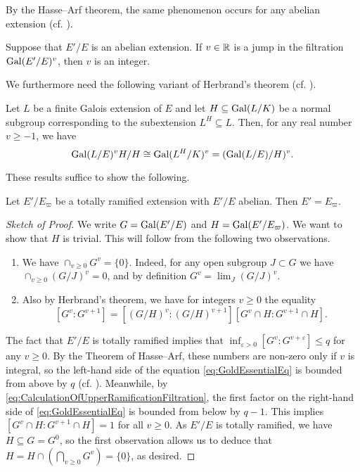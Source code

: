\documentclass[../main.tex]{subfiles}
\begin{document}
By the Hasse--Arf theorem, the same phenomenon occurs for any abelian extension 
(cf. \cite{arf1940untersuchungen}).
\begin{thm}\label{thm:Hasse--Arf}
  Suppose that $E'/E$ is an abelian extension. If $v \in \mathbb{R}$ is a jump in the 
  filtration $\operatorname{Gal}(E'/E)^v$, then $v$ is an integer.
\end{thm}

We furthermore need the following variant of Herbrand's theorem (cf. \cite[Chapter IV,
Proposition 14]{serre2013local}).
\begin{thm}\label{prop:HerbrandsThm}
  Let $L$ be a finite Galois extension of $E$ and let $H \subseteq \operatorname{Gal}(L/K)$ be a
  normal subgroup
  corresponding to the subextension $L^H \subseteq L$. Then, for any real number $v \geq -1$, 
  we have
  \begin{equation*}
    \operatorname{Gal}(L/E)^v H / H \cong \operatorname{Gal}(L^H/K)^v = (\operatorname{Gal}(L/E)/H)^v.
  \end{equation*}
\end{thm}

These results suffice to show the following.

\begin{lem}\label{lem:LocalKronWebAlmostDone}
  Let $E'/E_\varpi$ be a totally ramified extension with $E'/E$ abelian.
  Then $E' = E_\varpi$. 
\begin{proof}[Sketch of Proof]
  We write $G = \operatorname{Gal}(E'/E)$ and $H = \operatorname{Gal}(E'/E_\varpi)$. We want to show that 
  $H$ is trivial. This will follow from the following two observations.
  \begin{enumerate}
    \item We have $\cap_{v \geq 0} G^v = \{0\}$. Indeed, for any open subgroup
      $J \subset G$ we have $\cap_{v \geq 0} (G/J)^v = 0$, and by definition
      $G^v = \lim_J (G/J)^v$. 
    \item Also by Herbrand's theorem, we have for integers $v \geq 0$ the equality
      \begin{equation}\label{eq:GoldEssentialEq}
        [G^v : G^{v+1}] = [(G/H)^v : (G/H)^{v+1}] [G^v \cap H : G^{v+1} \cap H].
      \end{equation}
  \end{enumerate}
  The fact that $E'/E$ is totally ramified implies that $\inf_{\varepsilon > 0}
  [G^v: G^{v+\varepsilon}] \leq q$ for any $v \geq 0$. By the Theorem of 
  Hasse--Arf, these numbers are non-zero only if $v$ is integral, so
  the left-hand side of the equation \eqref{eq:GoldEssentialEq} is bounded from
  above by $q$ (cf. \cite[Lemma 3]{gold1981local}).
  Meanwhile, by \eqref{eq:CalculationOfUpperRamificationFiltration}, the first factor
  on the right-hand side of \eqref{eq:GoldEssentialEq} is bounded from below by
  $q-1$. This implies $[G^v \cap H : G^{v+1} \cap H] = 1$ for all $v \geq 0$. As $E'/E$ is totally ramified, we have
  $H \subseteq G = G^0$, so the first observation allows us
  to deduce that $H = H \cap \left( \bigcap_{v \geq 0} G^v \right) = \{0\}$, as desired.
\end{proof}
\end{lem}
\end{document}
